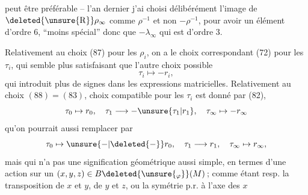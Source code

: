 peut être préférable -- l'an dernier j'ai choisi délibérément l'image de $\deleted{\unsure{\mathrm R}}\rho_\infty$ comme \inserted{$\lambda_\infty=$} $\rho^{-1}$ et non $-\rho^{-1}$, pour avoir un élément d'ordre 6, ``moins spécial'' donc que $-\lambda_\infty$ qui est d'ordre 3.

Relativement au choix (87) pour les $\rho_i$, on a le choix correspondant (72) pour les $\tau_i$, qui semble plus satisfaisant que l'autre choix possible
\[
\tau_i\mapsto-r_i,
\]
qui introduit plus de signes dans les expressions matricielles. Relativement au choix $(88)=(83)$,  choix  compatible pour les $\tau_i$ est donné par (82), 
\[
\tau_0\mapsto r_0,\quad\tau_1\longrightarrow-\unsure{\tau_1|r_1},\quad\tau_\infty\mapsto-r_\infty
\]
qu'on pourrait aussi remplacer par
\[
\tau_0\mapsto\unsure{-|\deleted{-}}r_0,\quad\tau_1\longrightarrow r_1,\quad\tau_\infty\mapsto r_\infty,
\]
mais qui n'a pas une signification géométrique aussi simple, en termes d'une action sur un $(x,y,z)\in B\deleted{\unsure{_{\varphi}}}(M)$\,; comme étant resp. la transposition de $x$ et $y$, de $y$ et $z$, ou la symétrie p.r. à l'axe des $x$

